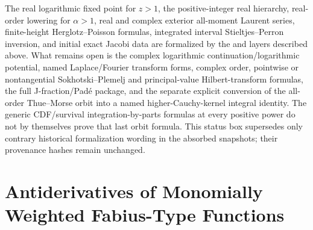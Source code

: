 \documentclass[11pt,oneside]{article}
\newcommand{\integrationreportreset}{%
  \clearpage
  \setcounter{section}{0}%
  \renewcommand{\thesection}{\arabic{section}}}
\theoremstyle{definition}
\theoremstyle{remark}
\newcommand{\1}{\mathbf 1}
\begin{document}
\begin{statusbox}
The real logarithmic fixed point for \(z>1\), the positive-integer real hierarchy,
real-order lowering for \(\alpha>1\), real and complex exterior all-moment Laurent
series, finite-height Herglotz--Poisson formulas, integrated interval
Stieltjes--Perron inversion, and initial exact Jacobi data are formalized by the
 and  layers described
above.  What remains open is the complex logarithmic continuation/logarithmic
potential, named Laplace/Fourier transform forms, complex order, pointwise or
nontangential Sokhotski--Plemelj and principal-value Hilbert-transform formulas,
the full J-fraction/Pad\'e package, and the separate explicit conversion of the
all-order Thue--Morse orbit into a named higher-Cauchy-kernel integral identity.
The generic CDF/survival integration-by-parts formulas at every positive power do
not by themselves prove that last orbit formula.
This status box supersedes only contrary historical formalization wording in the absorbed
snapshots; their provenance hashes remain unchanged.
\end{statusbox}
\clearpage
\integrationreportreset
\part{Antiderivatives of Monomially Weighted Fabius-Type Functions}
\end{document}
